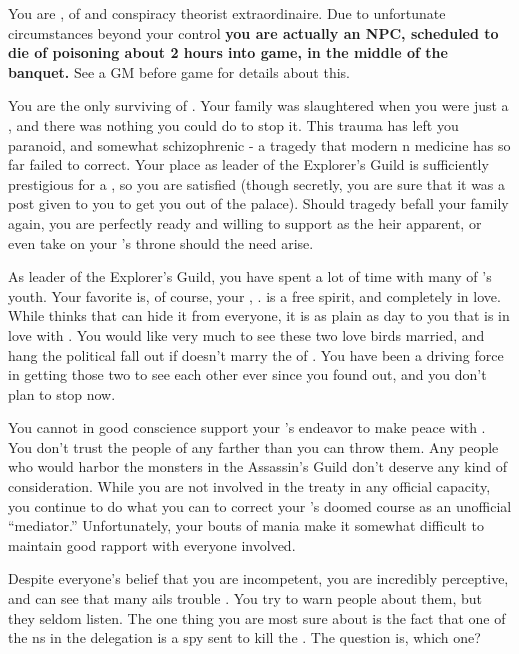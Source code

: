 \documentclass[char]{NeptuneBall}
\begin{document}
\name{\cPlant{}}

You are \cPlant{}, \cPlant{\prince} of \pAtlantis{} and conspiracy theorist extraordinaire. Due to unfortunate circumstances beyond your control {\bf you are actually an NPC, scheduled to die of poisoning about 2 hours into game, in the middle of the banquet. }  See a GM before game for details about this.

You are the only surviving \cPlant{\sibling} of \cKing{}. Your family was slaughtered when you were just a \cPlant{\kid}, and there was nothing you could do to stop it. This trauma has left you paranoid, and somewhat schizophrenic - a tragedy that modern \pAtlantis{}n medicine has so far failed to correct. Your place as leader of the Explorer's Guild is sufficiently prestigious for a \cPlant{\prince}, so you are satisfied (though secretly, you are sure that it was a post given to you to get you out of the palace). Should tragedy befall your family again, you are perfectly ready and willing to support \cPrincess{\prince} \cPrincess{} as the heir apparent, or even take on your \cKing{\sibling}'s throne should the need arise.

As leader of the Explorer's Guild, you have spent a lot of time with many of \pAtlantis{}'s youth. Your favorite is, of course, your \cPrincess{\nephew}, \cPrincess{\prince} \cPrincess{}. \cPrincess{\They} is a free spirit, and completely in love. While \cPrincess{\they} thinks that \cPrincess{\they} can hide it from everyone, it is as plain as day to you that \cPrincess{} is in love with \cDiplomat{}. You would like very much to see these two love birds married, and hang the political fall out if \cPrincess{} doesn't marry the \cPrince{\prince} of \pPacifica{}. You have been a driving force in getting those two to see each other ever since you found out, and you don't plan to stop now.

You cannot in good conscience support your \cKing{\sibling}'s endeavor to make peace with \pPacifica{}. You don't trust the people of \pPacifica{} any farther than you can throw them. Any people who would harbor the monsters in the Assassin's Guild don't deserve any kind of consideration. While you are not involved in the treaty in any official capacity, you continue to do what you can to correct your \cKing{\sibling}'s doomed course as an unofficial ``mediator.'' Unfortunately, your bouts of mania make it somewhat difficult to maintain good rapport with everyone involved.

Despite everyone's belief that you are incompetent, you are incredibly perceptive, and can see that many ails trouble \pAtlantis{}. You try to warn people about them, but they seldom listen. The one thing you are most sure about is the fact that one of the \pPacifica{}ns in the delegation is a spy sent to kill the \cKing{}. The question is, which one?
\end{document}
